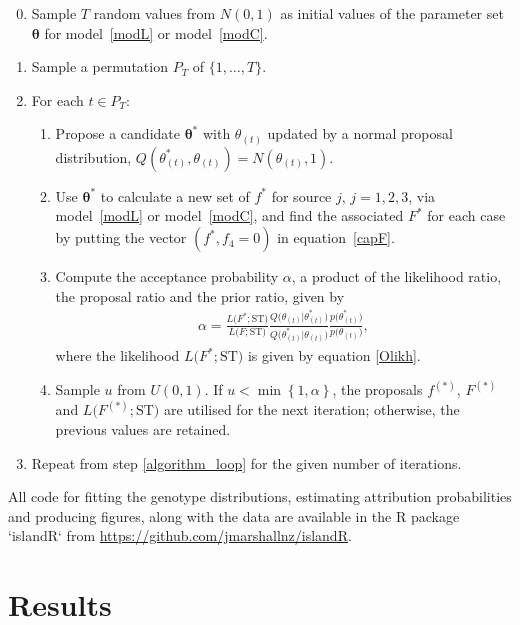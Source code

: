 \documentclass[AMA,STIX1COL]{WileyNJD-v2}
\begin{document}
\begin{enumerate}
\setcounter{enumi}{-1}
\item Sample $T$ random values from $N(0,1)$ as initial values of the parameter set $\boldsymbol{\theta}$ for model~\eqref{modL} or model~\eqref{modC}.
\item Sample a permutation $P_T$ of $\{1, \ldots, T\}$.\label{algorithm_loop}
\item For each $t \in P_T$:
\begin{enumerate}
\item Propose a candidate $\boldsymbol{\theta}^*$ with $\theta_{(t)}$ updated by a normal proposal distribution, $Q(\theta_{(t)}^*, \theta_{(t)}) = N(\theta_{(t)}, 1)$.

\item Use $\boldsymbol{\theta}^*$ to calculate a new set of $f^*$ for source $j$, $j=1, 2, 3$, via model~\eqref{modL} or model~\eqref{modC}, and find the associated $F^*$ for each case by putting the vector $(f^*, f_4=0)$ in equation~\eqref{capF}.

\item Compute the acceptance probability $\alpha$, a product of the likelihood ratio, the proposal ratio and the prior ratio, given by
\begin{align*}
\alpha=\frac{L\Big(F^*; \text{ST}\Big)}{L\Big(F; \text{ST}\Big)}\frac{Q\Big(\theta_{(t)} \vert \theta_{(t)}^*\Big)}{Q\Big(\theta_{(t)}^* \vert \theta_{(t)}\Big)}\frac{p\Big(\theta_{(t)}^*\Big)}{p\Big(\theta_{(t)}\Big)},
\end{align*}
where the likelihood $L\Big(F^*; \text{ST}\Big)$ is given by equation \eqref{Olikh}. \item Sample $u$ from $U(0,1)$. If $u < \min \left\{1, \alpha \right\}$, the proposals $f^{(*)}$, $F^{(*)}$ and $L\Big(F^{(*)}; \text{ST}\Big)$ are utilised for the next iteration; otherwise, the previous values are retained.
\end{enumerate}
\item Repeat from step \ref{algorithm_loop} for the given number of iterations.

\end{enumerate}

All code for fitting the genotype distributions, estimating attribution probabilities and producing figures, along with the data are available in the R package `islandR` from \url{https://github.com/jmarshallnz/islandR}.

\section{Results}
\end{document}
